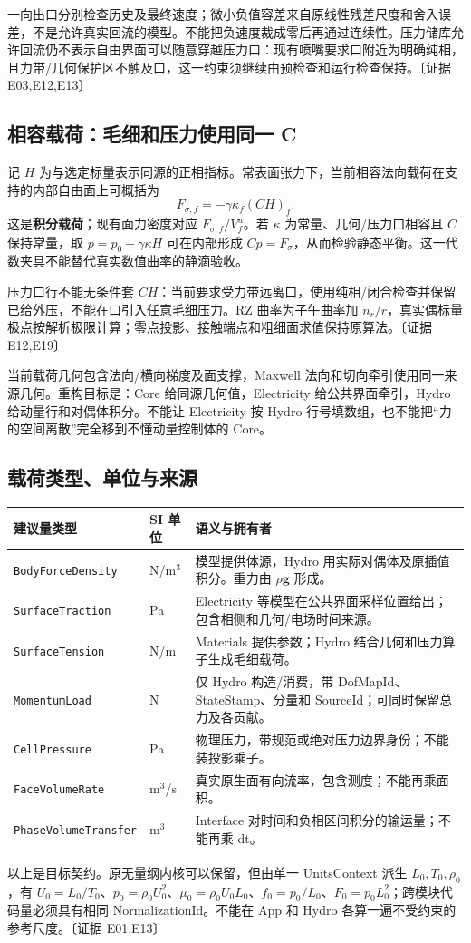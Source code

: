 \documentclass[UTF8,a4paper,11pt,fontset=fandol]{ctexart}
\newcommand{\code}[1]{\nolinkurl{#1}}
\newcommand{\ev}[1]{{\small\color{muted}〔证据 #1〕}}
\begin{document}
一向出口分别检查历史及最终速度；微小负值容差来自原线性残差尺度和舍入误差，不是允许真实回流的模型。不能把负速度裁成零后再通过连续性。压力储库允许回流仍不表示自由界面可以随意穿越压力口：现有喷嘴要求口附近为明确纯相，且力带/几何保护区不触及口，这一约束须继续由预检查和运行检查保持。\ev{E03,E12,E13}

\subsection{相容载荷：毛细和压力使用同一 C}
记 $H$ 为与选定标量表示同源的正相指标。常表面张力下，当前相容法向载荷在支持的内部自由面上可概括为
\begin{equation}
 F_{\sigma,f}=-\gamma\kappa_f(CH)_f.
 \label{eq:balanced}
\end{equation}
这是\textbf{积分载荷}；现有面力密度对应 $F_{\sigma,f}/V_f^u$。若 $\kappa$ 为常量、几何/压力口相容且 $C$ 保持常量，取 $p=p_0-\gamma\kappa H$ 可在内部形成 $Cp=F_\sigma$，从而检验静态平衡。这一代数夹具不能替代真实数值曲率的静滴验收。

压力口行不能无条件套 $C H$：当前要求受力带远离口，使用纯相/闭合检查并保留已给外压，不能在口引入任意毛细压力。RZ 曲率为子午曲率加 $n_r/r$，真实偶标量极点按解析极限计算；零点投影、接触端点和粗细面求值保持原算法。\ev{E12,E19}

当前载荷几何包含法向/横向梯度及面支撑，Maxwell 法向和切向牵引使用同一来源几何。重构目标是：Core 给同源几何值，Electricity 给公共界面牵引，Hydro 给动量行和对偶体积分。不能让 Electricity 按 Hydro 行号填数组，也不能把“力的空间离散”完全移到不懂动量控制体的 Core。

\subsection{载荷类型、单位与来源}
\begin{longtable}{@{}P{.24\textwidth}P{.16\textwidth}P{.54\textwidth}@{}}
\toprule 建议量类型 & SI 单位 & 语义与拥有者\\\midrule\endhead
\code{BodyForceDensity} & N/m$^3$ & 模型提供体源，Hydro 用实际对偶体及原插值积分。重力由 $\rho\bm g$ 形成。\\
\code{SurfaceTraction} & Pa & Electricity 等模型在公共界面采样位置给出；包含相侧和几何/电场时间来源。\\
\code{SurfaceTension} & N/m & Materials 提供参数；Hydro 结合几何和压力算子生成毛细载荷。\\
\code{MomentumLoad} & N & 仅 Hydro 构造/消费，带 DofMapId、StateStamp、分量和 SourceId；可同时保留总力及各贡献。\\
\code{CellPressure} & Pa & 物理压力，带规范或绝对压力边界身份；不能装投影乘子。\\
\code{FaceVolumeRate} & m$^3$/s & 真实原生面有向流率，包含测度；不能再乘面积。\\
\code{PhaseVolumeTransfer} & m$^3$ & Interface 对时间和负相区间积分的输运量；不能再乘 dt。\\
\bottomrule
\end{longtable}
以上是目标契约。原无量纲内核可以保留，但由单一 UnitsContext 派生 $L_0,T_0,\rho_0$，有 $U_0=L_0/T_0$、$p_0=\rho_0U_0^2$、$\mu_0=\rho_0U_0L_0$、$f_0=p_0/L_0$、$F_0=p_0L_0^2$；跨模块代码量必须具有相同 NormalizationId。不能在 App 和 Hydro 各算一遍不受约束的参考尺度。\ev{E01,E13}
\end{document}

